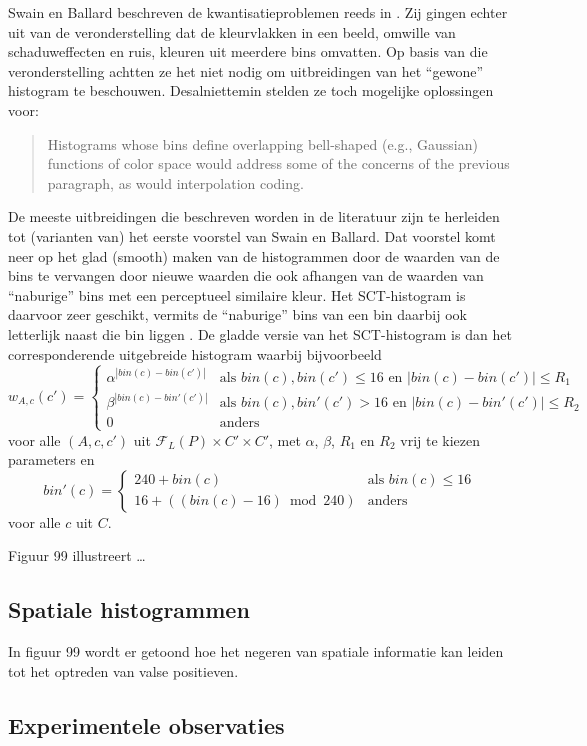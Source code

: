 Swain en Ballard beschreven de kwantisatieproblemen reeds in \cite{swain:color_indexing}.
Zij gingen echter uit van de veronderstelling dat de kleurvlakken in een beeld,
omwille van schaduweffecten en ruis,
kleuren uit meerdere bins omvatten. Op basis van die veronderstelling achtten ze
het niet nodig om uitbreidingen van het ``gewone'' histogram te beschouwen.
Desalniettemin stelden ze toch mogelijke oplossingen voor:
\begin{quote}
Histograms whose bins define overlapping bell-shaped (e.g., Gaussian) functions
of color space would address some of the concerns of the previous paragraph, as
would interpolation coding.
\end{quote}
De meeste uitbreidingen die beschreven worden in de literatuur 
\cite{jawahar:fuzzy_statistics_of_digital_images,
lu:perceptually_weighted_histograms_for_ir,
sural:perceptually_smooth_histogram,
vertan:embedding_fuzzy_logic_in_cbir, vertan:fuzzy_histograms} zijn
te herleiden tot (varianten van) het eerste voorstel van Swain en Ballard. Dat voorstel komt
neer op het glad (smooth) maken van de histogrammen door de waarden van de bins
te vervangen door nieuwe waarden die ook afhangen van de waarden van ``naburige''
bins met een perceptueel similaire kleur. Het SCT-histogram is daarvoor zeer
geschikt, vermits de ``naburige'' bins van een bin daarbij ook letterlijk naast
die bin liggen \cite{sural:perceptually_smooth_histogram}. De gladde versie van
het SCT-histogram is dan het corresponderende uitgebreide histogram waarbij bijvoorbeeld $$
w_{A,c}(c')=
\left\{ \begin{array}{ll}
\alpha^{|bin(c)-bin(c')|} & \textrm{als } bin(c), bin(c') \le 16 \textrm{ en } |bin(c)-bin(c')| \le R_1 \\
\beta^{|bin(c)-bin'(c')|} & \textrm{als } bin(c), bin'(c') > 16 \textrm{ en } |bin(c)-bin'(c')| \le R_2 \\ 
0 & \textrm{anders}
\end{array}
$$
voor alle $(A,c,c')$ uit $\mathcal{F}_L(P) \times C' \times C'$, met
$\alpha$, $\beta$, $R_1$ en $R_2$ vrij te kiezen parameters en 
$$
bin'(c) = \left\{ 
\begin{array}{ll} 240+bin(c) & \textrm{als } bin(c) \le 16 \\ 
16 + \left( (bin(c)-16) \bmod 240 \right) & \textrm{anders}
\end{array}
$$ 
voor alle $c$ uit $C$.

Figuur 99 illustreert \ldots

\subsection{Spatiale histogrammen}

In figuur 99 wordt er getoond hoe het negeren van spatiale informatie kan leiden
tot het optreden van valse positieven.

\subsection{Experimentele observaties}
